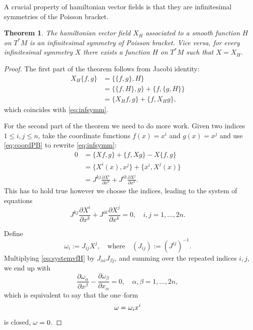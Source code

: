 \documentclass[english,fontsize=11pt,paper=a5,oneside]{scrbook}
\let\d\relax
\DeclareMathOperator{\d}{d}
\newtheorem{theorem}{Theorem}[chapter]
\theoremstyle{definition}
\begin{document}
A crucial property of hamiltonian vector fields is that they are infinitesimal symmetries of the Poisson bracket.

\begin{theorem}\label{thm:vf-infsym}
    The hamiltonian vector field $X_H$ associated to a smooth function $H$ on $T^*M$ is an infinitesimal symmetry of Poisson bracket.
    Vice versa, for every infinitesimal symmetry $X$ there exists a function $H$ on $T^*M$ such that $X = X_H$.
\end{theorem}
\begin{proof}
    The first part of the theorem follows from Jacobi identity:
    \begin{align}
        X_H \big\{f,g\big\} &= \big\{\big\{f,g\big\}, H\big\} \\
        &= \big\{\big\{f,H\big\},g\big\} + \big\{f,\big\{g,H\big\}\big\} \\
        &= \big\{X_Hf,g\big\} + \big\{f,X_Hg\big\},
    \end{align}
    which coincides with \eqref{eq:infsymm}.

    For the second part of the theorem we need to do more work.
    Given two indices $1\leq i,j \leq n$, take the coordinate functions $f(x) = x^i$ and $g(x) = x^j$ and use \eqref{eq:coordPB} to rewrite \eqref{eq:infsymm}:
    \begin{align}
        0 &= \big\{X f,g\big\} + \big\{f, Xg\big\} - X \big\{f,g\big\} \\
          &= \big\{X^i(x),x^j\big\} + \big\{x^i,X^j(x)\big\} \\
          &= J^{kj} \frac{\partial X^i}{\partial x^k} + J^{ik} \frac{\partial X^j}{\partial x^k}.
    \end{align}
    This has to hold true however we choose the indices, leading to the system of equations
    \begin{equation}\label{eq:systemvfH}
        J^{kj} \frac{\partial X^i}{\partial x^k} + J^{ik} \frac{\partial X^j}{\partial x^k} = 0, \quad i,j = 1,\ldots,2n.
    \end{equation}

    Define
    \begin{equation}
        \omega_i := J_{ij} X^j, \quad\mbox{where}\quad (J_{ij}) := (J^{ij})^{-1}.
    \end{equation}
    Multiplying \eqref{eq:systemvfH} by $J_{\alpha i} J_{\beta j}$, and summing over the repeated indices $i,j$, we end up with
    \begin{equation}
        \frac{\partial \omega_\alpha}{\partial x^\beta} - \frac{\partial \omega_\beta}{\partial x_\alpha} = 0, \quad \alpha,\beta = 1, \ldots, 2n,
    \end{equation}
    which is equivalent to say that the one--form
    \begin{equation}
        \omega = \omega_i \d x^i
    \end{equation}
    is closed, $\d \omega = 0$.


\end{proof}
\end{document}
